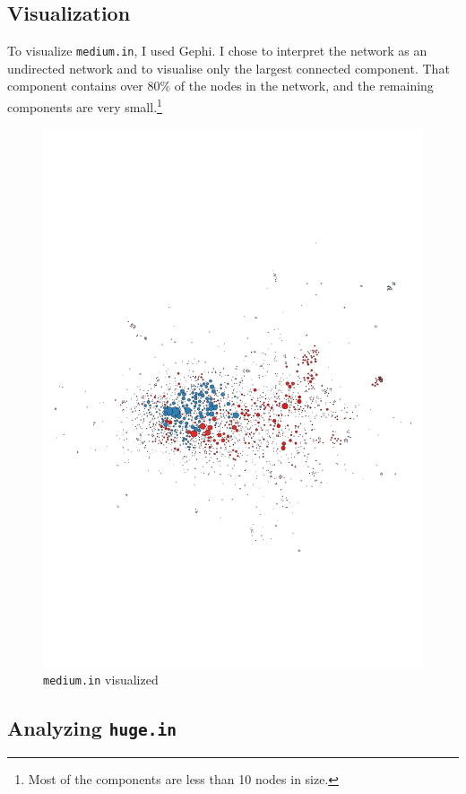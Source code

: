 \documentclass[12pt,a4paper,hidelinks]{article}
\begin{document}
\subsection{Visualization}

To visualize \texttt{medium.in}, I used Gephi. I chose to interpret the network as an undirected network and to visualise only the largest connected component. That component contains over 80\% of the nodes in the network, and the remaining components are very small.\footnote{Most of the components are less than 10 nodes in size.} 

\begin{figure}
	\centering
	\includegraphics[scale=0.5]{visualisation}
	\caption{\texttt{medium.in} visualized}
	\label{fig:visualisation}
\end{figure}

\subsection{Analyzing \texttt{huge.in}}
\end{document}
